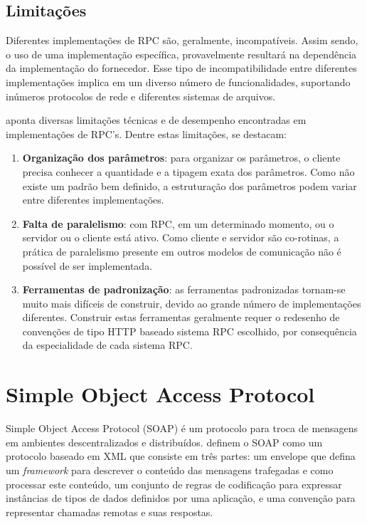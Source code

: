 \subsection{Limitações}

Diferentes implementações de RPC são, geralmente, incompatíveis. Assim sendo, o uso de uma implementação específica, provavelmente resultará na dependência da implementação do fornecedor. Esse tipo de incompatibilidade entre diferentes implementações implica em um diverso número de funcionalidades, suportando inúmeros protocolos de rede e diferentes sistemas de arquivos.

 aponta diversas limitações técnicas e de desempenho encontradas em implementações de RPC's. Dentre estas limitações, se destacam:

\begin{enumerate}[label=\alph*)]

\item \textbf{Organização dos parâmetros}: para organizar os parâmetros, o cliente precisa conhecer a quantidade e a tipagem exata dos parâmetros. Como não existe um padrão bem definido, a estruturação dos parâmetros podem variar entre diferentes implementações.

\item \textbf{Falta de paralelismo}: com RPC, em um determinado momento, ou o servidor ou o cliente está ativo. Como cliente e servidor são co-rotinas, a prática de paralelismo presente em outros modelos de comunicação não é possível de ser implementada.

\item \textbf{Ferramentas de padronização}: as ferramentas padronizadas tornam-se muito mais difíceis de construir, devido ao grande número de implementações diferentes. Construir estas ferramentas geralmente requer o redesenho de convenções de tipo HTTP baseado sistema RPC escolhido, por consequência da especialidade de cada sistema RPC.

\end{enumerate}

\section{Simple Object Access Protocol}\label{sec:soap}

Simple Object Access Protocol (SOAP) é um protocolo para troca de mensagens em ambientes descentralizados e distribuídos.  definem o SOAP como 
um protocolo baseado em XML que consiste em três partes: um envelope que defina um \textit{framework} para descrever o conteúdo das mensagens trafegadas e como processar este conteúdo, um conjunto de regras de codificação para expressar instâncias de tipos de dados definidos por uma aplicação, e uma convenção para representar chamadas remotas e suas respostas.

